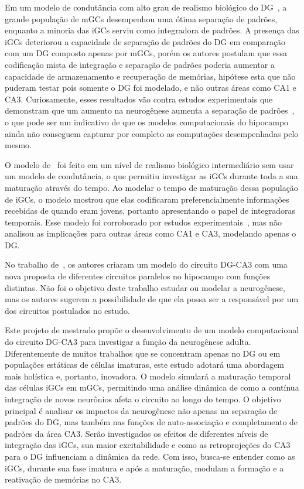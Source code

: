 Em um modelo de condutância com alto grau de realismo biológico do DG~\cite{kimEffect2024}, a grande população de mGCs desempenhou
uma ótima separação de padrões, enquanto a minoria das iGCs serviu como integradora de padrões. A presença das iGCs deteriorou a
capacidade de separação de padrões do DG em comparação com um DG composto apenas por mGCs, porém os autores postulam que essa
codificação mista de integração e separação de padrões poderia aumentar a capacidade de armazenamento e recuperação de memórias,
hipótese esta que não puderam testar pois somente o DG foi modelado, e não outras áreas como CA1 e CA3. Curiosamente, esses
resultados vão contra estudos experimentais que demonstram que um aumento na neurogênese aumenta a separação de
padrões~\cite{sahayIncreasing2011}, o que pode ser um indicativo de que os modelos computacionais do hipocampo ainda não conseguem
capturar por completo as computações desempenhadas pelo mesmo.

O modelo de~ foi feito em um nível de realismo biológico intermediário sem usar um modelo de
condutância, o que permitiu investigar as iGCs durante toda a sua maturação através do tempo. Ao modelar o tempo de maturação
dessa população de iGCs, o modelo mostrou que elas codificaram preferencialmente informações recebidas de quando eram jovens,
portanto apresentando o papel de integradoras temporais. Esse modelo foi corroborado por estudos
experimentais~\cite{berdugo-vegaSharpening2023}, mas não analisou as implicações para outras áreas como CA1 e CA3, modelando
apenas o DG.

No trabalho de~, os autores criaram um modelo do circuito DG-CA3 com uma nova proposta de diferentes
circuitos paralelos no hipocampo com funções distintas. Não foi o objetivo deste trabalho estudar ou modelar a neurogênese, mas os
autores sugerem a possibilidade de que ela possa ser a responsável por um dos circuitos postulados no estudo.

Este projeto de mestrado propõe o desenvolvimento de um modelo computacional do circuito DG-CA3 para investigar a função da
neurogênese adulta. Diferentemente de muitos trabalhos que se concentram apenas no DG ou em populações estáticas de células
imaturas, este estudo adotará uma abordagem mais holística e, portanto, inovadora. O modelo simulará a maturação temporal das
células iGCs em mGCs, permitindo uma análise dinâmica de como a contínua integração de novos neurônios afeta o circuito ao longo
do tempo. O objetivo principal é analisar os impactos da neurogênese não apenas na separação de padrões do DG, mas também nas
funções de auto-associação e completamento de padrões da área CA3. Serão investigados os efeitos de diferentes níveis de
integração das iGCs, sua maior excitabilidade e como as retroprojeções do CA3 para o DG influenciam a dinâmica da rede. Com isso,
busca-se entender como as iGCs, durante sua fase imatura e após a maturação, modulam a formação e a reativação de memórias no CA3.
